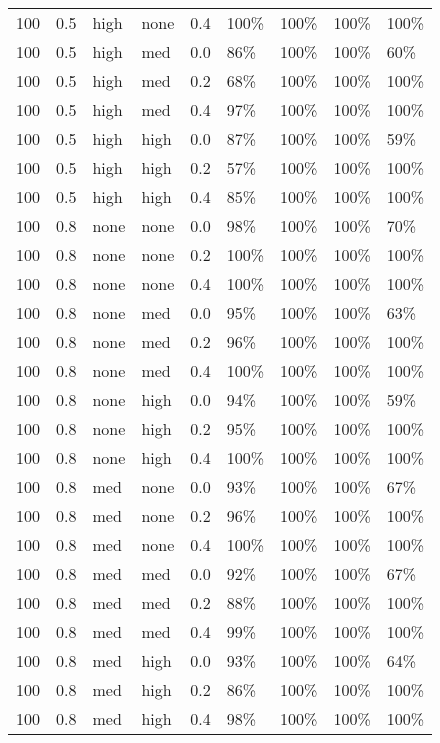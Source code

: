 \begin{longtable}{rrllrllll}
  100 & 0.5 & high & none & 0.4 & 100\% & 100\% & 100\% & 100\% \\ 
  100 & 0.5 & high & med & 0.0 & 86\% & 100\% & 100\% & 60\% \\ 
  100 & 0.5 & high & med & 0.2 & 68\% & 100\% & 100\% & 100\% \\ 
  100 & 0.5 & high & med & 0.4 & 97\% & 100\% & 100\% & 100\% \\ 
  100 & 0.5 & high & high & 0.0 & 87\% & 100\% & 100\% & 59\% \\ 
  100 & 0.5 & high & high & 0.2 & 57\% & 100\% & 100\% & 100\% \\ 
  100 & 0.5 & high & high & 0.4 & 85\% & 100\% & 100\% & 100\% \\ 
  100 & 0.8 & none & none & 0.0 & 98\% & 100\% & 100\% & 70\% \\ 
  100 & 0.8 & none & none & 0.2 & 100\% & 100\% & 100\% & 100\% \\ 
  100 & 0.8 & none & none & 0.4 & 100\% & 100\% & 100\% & 100\% \\ 
  100 & 0.8 & none & med & 0.0 & 95\% & 100\% & 100\% & 63\% \\ 
  100 & 0.8 & none & med & 0.2 & 96\% & 100\% & 100\% & 100\% \\ 
  100 & 0.8 & none & med & 0.4 & 100\% & 100\% & 100\% & 100\% \\ 
  100 & 0.8 & none & high & 0.0 & 94\% & 100\% & 100\% & 59\% \\ 
  100 & 0.8 & none & high & 0.2 & 95\% & 100\% & 100\% & 100\% \\ 
  100 & 0.8 & none & high & 0.4 & 100\% & 100\% & 100\% & 100\% \\ 
  100 & 0.8 & med & none & 0.0 & 93\% & 100\% & 100\% & 67\% \\ 
  100 & 0.8 & med & none & 0.2 & 96\% & 100\% & 100\% & 100\% \\ 
  100 & 0.8 & med & none & 0.4 & 100\% & 100\% & 100\% & 100\% \\ 
  100 & 0.8 & med & med & 0.0 & 92\% & 100\% & 100\% & 67\% \\ 
  100 & 0.8 & med & med & 0.2 & 88\% & 100\% & 100\% & 100\% \\ 
  100 & 0.8 & med & med & 0.4 & 99\% & 100\% & 100\% & 100\% \\ 
  100 & 0.8 & med & high & 0.0 & 93\% & 100\% & 100\% & 64\% \\ 
  100 & 0.8 & med & high & 0.2 & 86\% & 100\% & 100\% & 100\% \\ 
  100 & 0.8 & med & high & 0.4 & 98\% & 100\% & 100\% & 100\% \\ 

\end{longtable}
